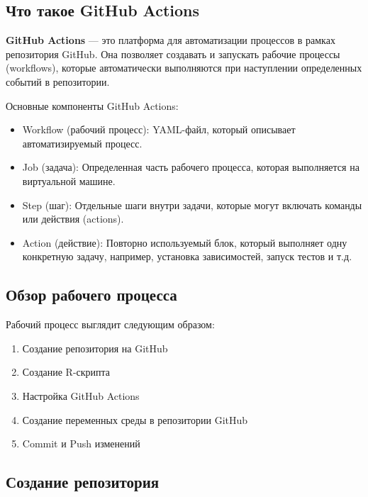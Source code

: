 \documentclass[
]{book}
\providecommand{\tightlist}{%
  \setlength{\itemsep}{0pt}\setlength{\parskip}{0pt}}
\begin{document}
\subsection{Что такое GitHub Actions}\label{ux447ux442ux43e-ux442ux430ux43aux43eux435-github-actions}

\textbf{GitHub Actions} --- это платформа для автоматизации процессов в рамках репозитория GitHub. Она позволяет создавать и запускать рабочие процессы (workflows), которые автоматически выполняются при наступлении определенных событий в репозитории.

Основные компоненты GitHub Actions:

\begin{itemize}
\tightlist
\item
  Workflow (рабочий процесс): YAML-файл, который описывает автоматизируемый процесс.
\item
  Job (задача): Определенная часть рабочего процесса, которая выполняется на виртуальной машине.
\item
  Step (шаг): Отдельные шаги внутри задачи, которые могут включать команды или действия (actions).
\item
  Action (действие): Повторно используемый блок, который выполняет одну конкретную задачу, например, установка зависимостей, запуск тестов и т.д.
\end{itemize}

\subsection{Обзор рабочего процесса}\label{ux43eux431ux437ux43eux440-ux440ux430ux431ux43eux447ux435ux433ux43e-ux43fux440ux43eux446ux435ux441ux441ux430}

Рабочий процесс выглядит следующим образом:

\begin{enumerate}
\def\labelenumi{\arabic{enumi}.}
\tightlist
\item
  Создание репозитория на GitHub
\item
  Создание R-скрипта
\item
  Настройка GitHub Actions
\item
  Создание переменных среды в репозитории GitHub
\item
  Commit и Push изменений
\end{enumerate}

\subsection{Создание репозитория}\label{ux441ux43eux437ux434ux430ux43dux438ux435-ux440ux435ux43fux43eux437ux438ux442ux43eux440ux438ux44f}
\end{document}
